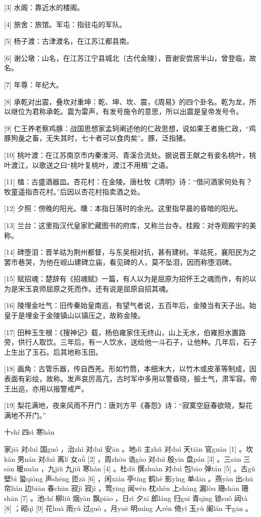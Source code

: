 \documentclass[12pt,UTF8]{ctexbook}
\begin{document}
[3] 水阁：靠近水的楼阁。

[4] 旅舍：旅馆。军屯：指驻屯的军队。

[5] 杨子渡：古津渡名，在江苏江都县南。

[6] 谢公墩：山名，在江苏江宁县城北（古代金陵），晋谢安尝居半山，曾登临，故名。

[7] 年尊：年纪大。

[8] 承乾对出震，叠坎对重坤：乾、坤、坎、震，《周易》的四个卦名。乾为龙，所以继位为君称承乾。震为雷声，有发号施令的意思，所以出震是皇帝发号令。

[9] 仁王养老察鸡豚：战国思想家孟轲阐述他的仁政思想，说如果王者施仁政，“鸡豚狗彘之畜，无失其时，七十者可以食肉矣”。豚，泛指猪。

[10] 桃叶渡：在江苏南京市内秦淮河、青溪合流处。据说晋王献之有妾名桃叶，桃叶渡江，以歌送之曰“桃叶复桃叶，渡江不用楫”之语。

[11] 榼：古盛酒器皿。杏花村：在金陵。唐杜牧《清明》诗：“借问酒家何处有？牧童遥指杏花村。”后因以杏花村指卖酒之处。

[12] 夕照：傍晚的阳光。曛：本指日落时的余光。这里指早晨的昏暗的阳光。

[13] 兰台：这里指汉代皇家贮藏图书的府库，又称兰台寺。桂殿：对寺观殿宇的美称。

[14] 碑堕泪：晋羊祜为荆州都督，与东吴相对抗，甚有建树。羊祜死，襄阳民为之罢巿巷哭，为他在岘山建碑立庙，看见碑的人，莫不坠泪，因而称堕泪碑。

[15] 赋招魂：楚辞有《招魂赋》一篇，有人以为是屈原为招怀王之魂而作，有的以为是宋玉哀师屈原之死而作。还有说是屈原自招其魂。

[16] 陵埋金吐气：旧传秦始皇南巡，有望气者说，五百年后，金陵当有天子出。始皇于是埋金于金陵镇山以镇压之，故称金陵。

[17] 田种玉生根：《搜神记》载，杨伯雍家住无终山，山上无水，伯雍担水置路旁，供行人取饮。三年后，有一人饮水，送给他一斗石子，让他种。几年后，石子上生出了玉石。后其地称玉田。

[18] 画角：古管乐器，传自西羌。形如竹筒，本细末大，以竹木或皮革等制成，因表面有彩绘，故称。发声哀厉高亢，古时军中多用以警昏晓，振士气，肃军容。帝王出巡，亦用以报警戒严。

[19] 梨花满地，夜来风雨不开门：唐刘方平《春怨》诗：“寂寞空庭春欲晓，梨花满地不开门。”





十shí 四sì 寒hán


家jiā 对duì 国guó ，治zhì 对duì 安ān 。地dì 主zhǔ 对duì 天tiān 官guān [1] 。坎kǎn 男nán 对duì 离lí 女nǚ [2] ，周zhōu 诰gào 对duì 殷yīn 盘pán [3] 。三sān 三sān 暖nuǎn ，九jiǔ 九jiǔ 寒hán [4] 。杜dù 撰zhuàn 对duì 包bāo 弹tán [5] 。古gǔ 壁bì 蛩qióng 声shēng 匝zā [6] ，闲xián 亭tíng 鹤hè 影yǐng 单dān 。燕yàn 出chū 帘lián 边biān 春chūn 寂jì 寂jì ，莺yīng 闻wén 枕zhěn 上shàng 漏lòu 珊shān 珊shān [7] 。池chí 柳liǔ 烟yān 飘piāo ，日rì 夕xī 郎láng 归guī 青qīng 锁suǒ 闼tà [8] ；砌qì [9] 花huā 雨yǔ 过guò ，月yuè 明míng 人rén 倚yǐ 玉yù 阑lán 干gān 。
\end{document}
